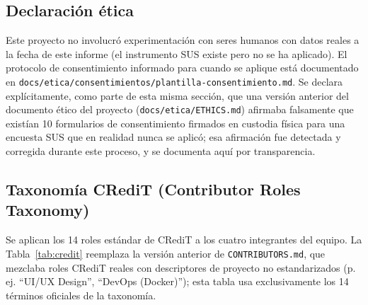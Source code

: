 \subsection*{Declaración ética}
Este proyecto no involucró experimentación con seres humanos con datos reales a la fecha de este informe
(el instrumento SUS existe pero no se ha aplicado). El protocolo de consentimiento informado para cuando
se aplique está documentado en \texttt{docs/etica/consentimientos/plantilla-consentimiento.md}. Se
declara explícitamente, como parte de esta misma sección, que una versión anterior del documento ético
del proyecto (\texttt{docs/etica/ETHICS.md}) afirmaba falsamente que existían 10 formularios de
consentimiento firmados en custodia física para una encuesta SUS que en realidad nunca se aplicó; esa
afirmación fue detectada y corregida durante este proceso, y se documenta aquí por transparencia.

\subsection*{Taxonomía CRediT (Contributor Roles Taxonomy)}

Se aplican los 14 roles estándar de CRediT \cite{brand2015} a los cuatro integrantes del equipo. La
Tabla~\ref{tab:credit} reemplaza la versión anterior de \texttt{CONTRIBUTORS.md}, que mezclaba roles
CRediT reales con descriptores de proyecto no estandarizados (p. ej. ``UI/UX Design'', ``DevOps
(Docker)''); esta tabla usa exclusivamente los 14 términos oficiales de la taxonomía.

